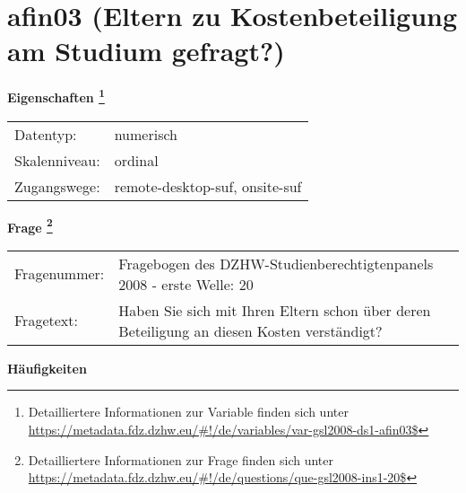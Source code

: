 
    \setcounter{footnote}{0}

    \vspace*{-1.8cm}
	\section{afin03 (Eltern zu Kostenbeteiligung am Studium gefragt?)}
	\label{section:afin03}



    \vspace*{0.5cm}
    \noindent\textbf{Eigenschaften
	\footnote{Detailliertere Informationen zur Variable finden sich unter
		\url{https://metadata.fdz.dzhw.eu/\#!/de/variables/var-gsl2008-ds1-afin03$}}}\\
	\begin{tabularx}{\hsize}{@{}lX}
	Datentyp: & numerisch \\
	Skalenniveau: & ordinal \\
	Zugangswege: &
	  remote-desktop-suf, 
	  onsite-suf
 \\
    \end{tabularx}



				\vspace*{0.5cm}
                \noindent\textbf{Frage
	                \footnote{Detailliertere Informationen zur Frage finden sich unter
		              \url{https://metadata.fdz.dzhw.eu/\#!/de/questions/que-gsl2008-ins1-20$}}}\\
				\begin{tabularx}{\hsize}{@{}lX}
					Fragenummer: &
					  Fragebogen des DZHW-Studienberechtigtenpanels 2008 - erste Welle:
					  20
 \\
					Fragetext: & Haben Sie sich mit Ihren Eltern schon über deren Beteiligung an diesen Kosten verständigt? \\
				\end{tabularx}





        		\vspace*{0.5cm}
                \noindent\textbf{Häufigkeiten}


